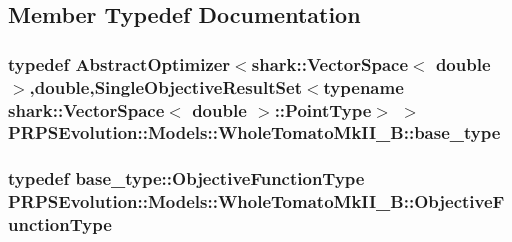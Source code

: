 \subsection{\-Member \-Typedef \-Documentation}
\hypertarget{struct_p_r_p_s_evolution_1_1_models_1_1_whole_tomato_mk_i_i___b_a63167da085f1e1847f1dd13875786010}{
\subsubsection[{base\-\_\-type}]{\setlength{\rightskip}{0pt plus 5cm}typedef \-Abstract\-Optimizer$<$shark\-::\-Vector\-Space$<$ double $>$,double,\-Single\-Objective\-Result\-Set$<$typename shark\-::\-Vector\-Space$<$ double $>$\-::\-Point\-Type$>$ $>$ {\bf \-P\-R\-P\-S\-Evolution\-::\-Models\-::\-Whole\-Tomato\-Mk\-I\-I\-\_\-\-B\-::base\-\_\-type}}}\label{struct_p_r_p_s_evolution_1_1_models_1_1_whole_tomato_mk_i_i___b_a63167da085f1e1847f1dd13875786010}
\hypertarget{struct_p_r_p_s_evolution_1_1_models_1_1_whole_tomato_mk_i_i___b_a48d48c59511c1055a60b819aeaf22c80}{
\subsubsection[{\-Objective\-Function\-Type}]{\setlength{\rightskip}{0pt plus 5cm}typedef base\-\_\-type\-::\-Objective\-Function\-Type {\bf \-P\-R\-P\-S\-Evolution\-::\-Models\-::\-Whole\-Tomato\-Mk\-I\-I\-\_\-\-B\-::\-Objective\-Function\-Type}}}\label{struct_p_r_p_s_evolution_1_1_models_1_1_whole_tomato_mk_i_i___b_a48d48c59511c1055a60b819aeaf22c80}


